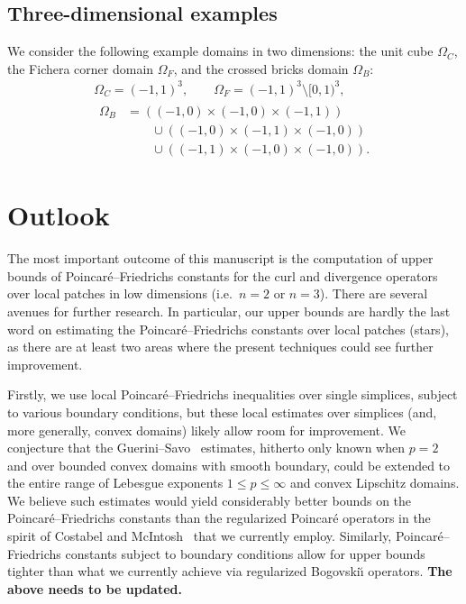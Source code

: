 \documentclass[10pt,a4paper]{article}
\newcommand{\todo}[1]{{\color{RedOrange}\textbf{#1}}}
\begin{document}
\subsection{Three-dimensional examples}

We consider the following example domains in two dimensions:
the unit cube $\Omega_C$, the Fichera corner domain $\Omega_F$, and the crossed bricks domain $\Omega_{B}$:
\begin{gather*}
    \Omega_{C}  = (-1,1)^3,
    \qquad 
    \Omega_{F}  = (-1,1)^3 \setminus [0,1)^3,
    \\
    \begin{aligned}
    \Omega_{B} &= 
    \left( (-1,0) \times (-1,0) \times (-1,1) \right)
    \\&\qquad
    \cup 
    \left( (-1,0) \times (-1,1) \times (-1,0) \right)
    \\&\qquad
    \cup 
    \left( (-1,1) \times (-1,0) \times (-1,0) \right)
    .
    \end{aligned}
\end{gather*}





\section{Outlook}\label{section:outlook}

The most important outcome of this manuscript is the computation of upper bounds of Poincar\'e--Friedrichs constants for the curl and divergence operators over local patches in low dimensions (i.e.\ $n=2$ or $n=3$). 
There are several avenues for further research. 
In particular, our upper bounds are hardly the last word on estimating the Poincar\'e--Friedrichs constants over local patches (stars), 
as there are at least two areas where the present techniques could see further improvement. 


Firstly, we use local Poincar\'e--Friedrichs inequalities over single simplices, subject to various boundary conditions, but these local estimates over simplices (and, more generally, convex domains) likely allow room for improvement. We conjecture that the Guerini--Savo~\cite{guerini2004eigenvalue} estimates, hitherto only known when $p=2$ and over bounded convex domains with smooth boundary, could be extended to the entire range of Lebesgue exponents $1 \leq p \leq \infty$ and convex Lipschitz domains. 
We believe such estimates would yield considerably better bounds on the Poincar\'e--Friedrichs constants than the regularized Poincar\'e operators in the spirit of Costabel and McIntosh~\cite{costabel2010bogovskiui} that we currently employ. Similarly, Poincar\'e--Friedrichs constants subject to boundary conditions allow for upper bounds tighter than what we currently achieve via regularized Bogovski\u{\i} operators. 
\todo{The above needs to be updated.}
\end{document}

